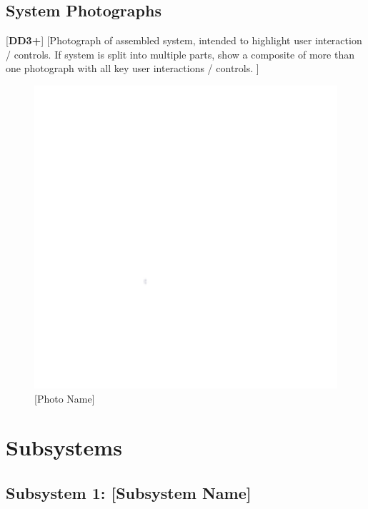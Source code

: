\documentclass[letterpaper, 11pt]{article}
\begin{document}
\subsection{System Photographs} %
[\textbf{DD3+}]
[Photograph of assembled system, intended to highlight user interaction / controls. If system is split into multiple parts, show a composite of more than one photograph with all key user interactions / controls. ]
\begin{figure}[h]
    \centering
    \includegraphics[width=16cm]{images/white.png} %
    \caption{[Photo Name]}
\end{figure}

\clearpage
\section{Subsystems}

\subsection{Subsystem 1: [Subsystem Name]}

\end{document}
